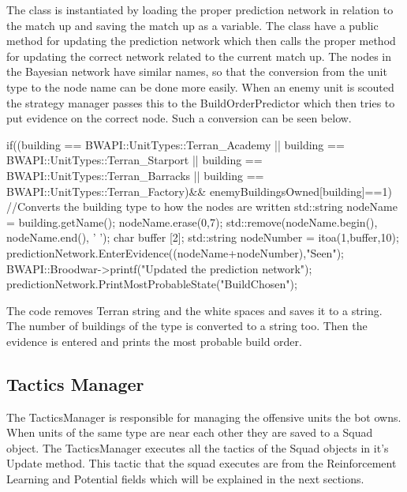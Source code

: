 			The class is instantiated by loading the proper prediction network in relation to the match up and saving the match up as a variable. 
			The class have a public method for updating the prediction network which then calls the proper method for updating the correct network related 
			to the current match up. The nodes in the Bayesian network have similar names, so that the conversion from the unit type to the node name can be 
			done more easily. When an enemy unit is scouted the strategy manager passes this to the BuildOrderPredictor which then tries to put evidence 
			on the correct node. Such a conversion can be seen below.
			\begin{Sourcecode}[caption=Conversion from unit type to node name]		
	if((building == BWAPI::UnitTypes::Terran_Academy || 
			building == BWAPI::UnitTypes::Terran_Starport ||
			building == BWAPI::UnitTypes::Terran_Barracks ||
			building == BWAPI::UnitTypes::Terran_Factory)&& 
			enemyBuildingsOwned[building]==1)
	{
		//Converts the building type to how the nodes are written
		std::string nodeName = building.getName();
		nodeName.erase(0,7);
		std::remove(nodeName.begin(), nodeName.end(), ' ');
		char buffer [2];
		std::string nodeNumber = itoa(1,buffer,10);	
		predictionNetwork.EnterEvidence((nodeName+nodeNumber),"Seen");
		BWAPI::Broodwar->printf("Updated the prediction network");
		predictionNetwork.PrintMostProbableState("BuildChosen");
	}
			\end{Sourcecode}
			 The code removes Terran string and the white spaces and saves it to a string. The number of buildings of the type is converted to a string too. 
			 Then the evidence is entered and prints the most probable build order.
	\subsection{Tactics Manager}
		The TacticsManager is responsible for managing the offensive units the bot owns. When units of the same type are near each other they are saved 
		to a Squad object. The TacticsManager executes all the tactics of the Squad objects in it's Update method. This tactic that the squad executes 
		are from the Reinforcement Learning and Potential fields which will be explained in the next sections.
		
			
		
			
			
				
			
		

